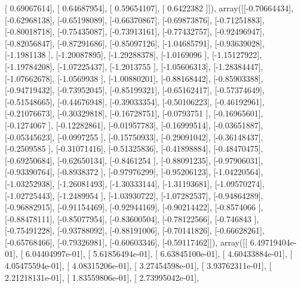 \documentclass{article}
\begin{document}
       [ 0.69067614],
       [ 0.64687954],
       [ 0.59654107],
       [ 0.6422382 ]]), array([[-0.70664434],
       [-0.62968138],
       [-0.65198089],
       [-0.66370867],
       [-0.69873876],
       [-0.71251883],
       [-0.80018718],
       [-0.75435087],
       [-0.73913161],
       [-0.77432757],
       [-0.92496947],
       [-0.82056847],
       [-0.87291686],
       [-0.85097126],
       [-1.04685791],
       [-0.93639028],
       [-1.1981138 ],
       [-1.20087895],
       [-1.29288378],
       [-1.0169096 ],
       [-1.15127922],
       [-1.19784208],
       [-1.07225437],
       [-1.2013755 ],
       [-1.05606313],
       [-1.28384447],
       [-1.07662678],
       [-1.0569938 ],
       [-1.00880201],
       [-0.88168442],
       [-0.85903388],
       [-0.94719432],
       [-0.73952045],
       [-0.85199321],
       [-0.65162417],
       [-0.57374649],
       [-0.51548665],
       [-0.44676948],
       [-0.39033354],
       [-0.50106223],
       [-0.46192961],
       [-0.21076673],
       [-0.30329818],
       [-0.16728751],
       [-0.0793751 ],
       [-0.16965601],
       [-0.1274067 ],
       [-0.12282861],
       [-0.01957783],
       [-0.16999514],
       [-0.03651887],
       [-0.05345623],
       [-0.0997255 ],
       [-0.15750933],
       [-0.29091042],
       [-0.36148437],
       [-0.2509585 ],
       [-0.31071416],
       [-0.51325836],
       [-0.41898884],
       [-0.48470475],
       [-0.69250684],
       [-0.62650134],
       [-0.8461254 ],
       [-0.88091235],
       [-0.97906031],
       [-0.93390764],
       [-0.8938372 ],
       [-0.97976299],
       [-0.95206123],
       [-1.04220564],
       [-1.03252938],
       [-1.26081493],
       [-1.30333144],
       [-1.31193681],
       [-1.09570274],
       [-1.02725443],
       [-1.2489954 ],
       [-1.03930722],
       [-1.07282537],
       [-0.94864289],
       [-0.96882915],
       [-0.91154469],
       [-0.92944169],
       [-0.90214422],
       [-0.8574066 ],
       [-0.88478111],
       [-0.85077954],
       [-0.83600504],
       [-0.78122566],
       [-0.746843  ],
       [-0.75491228],
       [-0.93788092],
       [-0.88191006],
       [-0.70141826],
       [-0.66628261],
       [-0.65768466],
       [-0.79326981],
       [-0.60603346],
       [-0.59117462]]), array([[  6.49719404e-01],
       [  6.04404997e-01],
       [  5.61856494e-01],
       [  6.63845100e-01],
       [  4.60433884e-01],
       [  4.05475594e-01],
       [  4.08315206e-01],
       [  3.27454598e-01],
       [  3.93762311e-01],
       [  2.21218131e-01],
       [  1.83559806e-01],
       [  2.73995042e-01],
\end{document}

